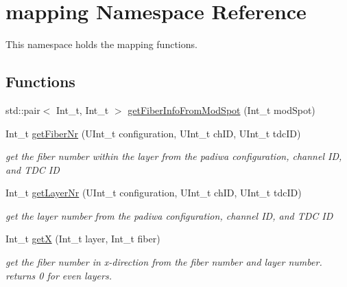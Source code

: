 \hypertarget{namespacemapping}{}\section{mapping Namespace Reference}
\label{namespacemapping}


This namespace holds the mapping functions.  


\subsection*{Functions}
\begin{DoxyCompactItemize}
\item 
std\+::pair$<$ Int\+\_\+t, Int\+\_\+t $>$ \hyperlink{namespacemapping_aa1474356b6c030e524bce7a388e20cd8}{get\+Fiber\+Info\+From\+Mod\+Spot} (Int\+\_\+t mod\+Spot)
\item 
\mbox{\label{namespacemapping_a669c8c96499dd4cfc01a5fdf1bde8c41}} 
Int\+\_\+t \hyperlink{namespacemapping_a669c8c96499dd4cfc01a5fdf1bde8c41}{get\+Fiber\+Nr} (U\+Int\+\_\+t configuration, U\+Int\+\_\+t ch\+ID, U\+Int\+\_\+t tdc\+ID)
\begin{DoxyCompactList}\small\item\em get the fiber number within the layer from the padiwa configuration, channel ID, and T\+DC ID \end{DoxyCompactList}\item 
\mbox{\label{namespacemapping_a43a9e5bffd76bc38c7db7eb18a6b70e0}} 
Int\+\_\+t \hyperlink{namespacemapping_a43a9e5bffd76bc38c7db7eb18a6b70e0}{get\+Layer\+Nr} (U\+Int\+\_\+t configuration, U\+Int\+\_\+t ch\+ID, U\+Int\+\_\+t tdc\+ID)
\begin{DoxyCompactList}\small\item\em get the layer number from the padiwa configuration, channel ID, and T\+DC ID \end{DoxyCompactList}\item 
\mbox{\label{namespacemapping_a02282299fd81a205ed060a81bdf12aaf}} 
Int\+\_\+t \hyperlink{namespacemapping_a02282299fd81a205ed060a81bdf12aaf}{getX} (Int\+\_\+t layer, Int\+\_\+t fiber)
\begin{DoxyCompactList}\small\item\em get the fiber number in x-\/direction from the fiber number and layer number. returns 0 for even layers. \end{DoxyCompactList}\item 

\end{DoxyCompactItemize}
